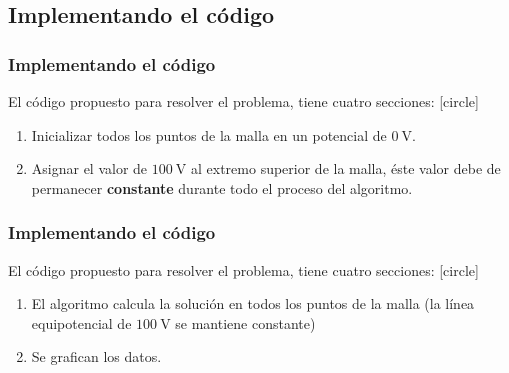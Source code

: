 \subsection{Implementando el código}
\begin{frame}
\frametitle{Implementando el código}
El código propuesto para resolver el problema, tiene cuatro secciones:
[circle]
\begin{enumerate}[<+->]
\item Inicializar todos los puntos de la malla en un potencial de $\SI{0}{\volt}$.
\item Asignar el valor de $\SI{100}{\volt}$ al extremo superior de la malla, éste valor debe de permanecer \textbf{constante} durante todo el proceso del algoritmo.
\seti
\end{enumerate}
\end{frame}
\begin{frame}
\frametitle{Implementando el código}
El código propuesto para resolver el problema, tiene cuatro secciones:
[circle]
\begin{enumerate}[<+->]
\conti    
\item El algoritmo calcula la solución en todos los puntos de la malla (la línea equipotencial de $\SI{100}{\volt}$ se mantiene constante)
\item Se grafican los datos.
\end{enumerate}
\end{frame}
